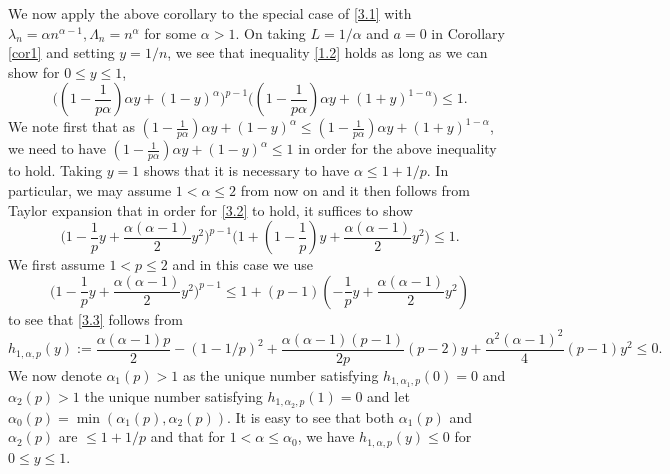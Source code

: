 \documentclass[11pt]{amsart}
\numberwithin{equation}{section}
\theoremstyle{definition}
\theoremstyle{remark}
\begin{document}
   We now apply the above corollary to the special case of
   \eqref{3.1} with $\lambda_n=\alpha n^{\alpha-1}, \Lambda_n=n^{\alpha}$ for some $\alpha>1$. On taking
   $L=1/\alpha$ and $a=0$ in Corollary \ref{cor1} and setting $y=1/n$, we see that inequality
   \eqref{1.2} holds as long as we can show for $0 \leq y \leq 1$,
\begin{equation}
\label{3.2}
  \Big((1-\frac {1}{p \alpha})\alpha y+(1-y)^{\alpha} \Big
)^{p-1}\Big ( (1-\frac {1}{p \alpha})\alpha y+(1+y)^{1-\alpha}
\Big ) \leq 1.
\end{equation}
   We note first that as $(1-\frac {1}{p \alpha})\alpha
   y+(1-y)^{\alpha} \leq (1-\frac {1}{p \alpha})\alpha
   y+(1+y)^{1-\alpha}$, we need to have $(1-\frac {1}{p \alpha})\alpha
   y+(1-y)^{\alpha} \leq 1$ in order for the above inequality to
   hold. Taking $y=1$ shows that it is necessary to have
   $\alpha \leq 1+1/p$. In particular, we may assume $1< \alpha \leq 2$ from now on and it then follows from Taylor expansion that in order
   for \eqref{3.2} to hold, it suffices to show
\begin{equation}
\label{3.3}
  \Big(1-\frac {1}{p}y+\frac {\alpha(\alpha-1)}{2}y^2 \Big
)^{p-1}\Big ( 1+(1-\frac {1}{p})y+\frac {\alpha(\alpha-1)}{2}y^2
\Big ) \leq 1.
\end{equation}
   We first assume $1<p \leq 2$ and in this case we use
\begin{equation*}
  \Big(1-\frac {1}{p}y+\frac {\alpha(\alpha-1)}{2}y^2 \Big
)^{p-1} \leq 1+(p-1)(-\frac {1}{p}y+\frac
{\alpha(\alpha-1)}{2}y^2)
\end{equation*}
   to see that \eqref{3.3} follows from
\begin{equation*}
  h_{1,\alpha, p}(y):=\frac {\alpha(\alpha-1)p}{2}-(1-1/p)^2+\frac
  {\alpha(\alpha-1)(p-1)}{2p}(p-2)y+\frac
  {\alpha^2(\alpha-1)^2}{4}(p-1)y^2 \leq 0.
\end{equation*}
   We now denote $\alpha_1(p)>1$ as the unique number satisfying $h_{1, \alpha_1,p}(0)=0$ and $\alpha_2(p)>1$ the unique number satisfying
   $h_{1, \alpha_2,p}(1)=0$ and let $\alpha_0(p)=\min (\alpha_1(p), \alpha_2(p)
   )$. It is easy to see that both $\alpha_1(p)$ and $\alpha_2(p)$ are $\leq 1+1/p$ and that for $1<\alpha \leq \alpha_0$, we have $h_{1, \alpha,
   p}(y)\leq 0$ for $0 \leq y \leq 1$.
\end{document}
